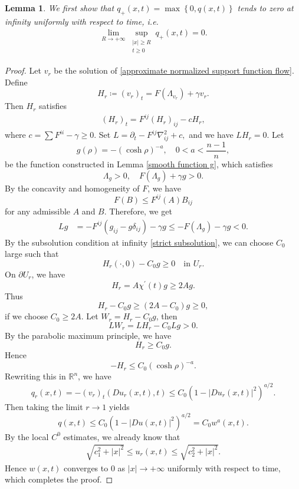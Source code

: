 \documentclass[reqno]{amsart}
\newtheorem{lemma}[theorem]{Lemma}
\theoremstyle{remark}
\theoremstyle{definition}
\numberwithin{equation}{section}
\begin{document}
\begin{lemma}\label{q+ uniform}
    We first show that $q_+(x, t) = \max\left\{0,q(x,t)\right\}$ tends to zero at infinity uniformly with respect to time, i.e.
    \begin{align}
    \lim_{R\to+\infty} \sup_{\substack{|x| \geqslant R \\ t \geqslant 0}}q_+(x, t)=0.
    \end{align}
\end{lemma}
\begin{proof}
    Let $v_r$ be the solution of \eqref{approximate normalized support function flow}. Define
    \[
    H_r \coloneqq (v_r)_t = F(\Lambda_{v_r}) + \gamma v_r.
    \]
    Then $H_r$ satisfies
    \begin{align}
    (H_r)_t = F^{ij} (H_r)_{ij} - c H_r,
    \end{align}
    where $c = \sum F^{ii} - \gamma \geqslant 0$. Set
    $
    L = \partial_t - F^{ij} \nabla^2_{ij} + c,
    $
    and we have $L H_r = 0$.
    Let
    \[
    g(\rho) = -(\cosh\rho)^{-a},
    \quad
    0 < a < \frac{n-1}{n},
    \]
    be the function constructed in Lemma \ref{smooth function g}, which satisfies
    \[
    \Lambda_g > 0, \quad F(\Lambda_g) + \gamma g > 0.
    \]
    By the concavity and homogeneity of $F$, we have
    \[
    F(B)\leqslant F^{ij}(A)B_{ij}
    \]
    for any admissible $A$ and $B$. Therefore, we get
    \begin{align*}
    Lg &= - F^{ij}\left( g_{ij} - g\delta_{ij} \right) - \gamma g \leqslant - F(\Lambda_g) - \gamma g < 0.
    \end{align*}
    By the subsolution condition at infinity \eqref{strict subsolution}, we can choose $C_0$ large such that
    \[
    H_r(\cdot, 0) - C_0 g \geqslant 0 \quad \text{in } U_r.
    \]
    On $\partial U_r$, we have
    \[
    H_r = A \chi^{\prime}(t) g \geqslant 2A g.
    \]
    Thus
    \[
    H_r - C_0 g \geqslant (2A - C_0)g \geqslant 0,
    \]
    if we choose $C_0 \geqslant 2A$. Let $W_r = H_r - C_0 g$, then
    \[
    L W_r = L H_r - C_0 Lg > 0.
    \]
    By the parabolic maximum principle, we have
    \[
    H_r \geqslant C_0 g.
    \]
    Hence
    \[
    -H_r \leqslant C_0 (\cosh\rho)^{-a}.
    \]
    Rewriting this in $\mathbb{R}^n$, we have
    \[
    q_r(x, t)=-(v_r)_t(Du_r(x,t),t)\leqslant C_0 (1-|Du_r(x,t)|^2)^{a/2}.
    \]
    Then taking the limit $r \to 1$ yields 
    \[
    q(x, t) \leqslant C_0 (1-|Du(x,t)|^2)^{a/2}=C_0w^a(x,t).
    \]
    By the local $C^0$ estimates, we already know that
    \begin{align}\label{hyperboloid trapping}
        \sqrt{c_1^2 + |x|^2} \leqslant u_r(x,t) \leqslant \sqrt{c_2^2 + |x|^2}.
    \end{align}
    Hence $w(x, t)$ converges to $0$ as $|x| \to +\infty$ uniformly with respect to time, which completes the proof.
\end{proof}
\end{document}
